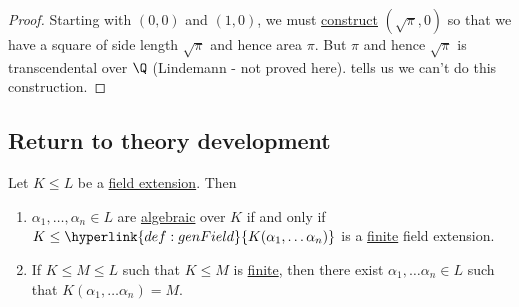 \documentclass{article}
\begin{document}
\begin{proof}
    Starting with $(0, 0)$ and $(1, 0)$, we must \hyperlink{def:constructible}{construct} $(\sqrt{\pi}, 0)$ so that we have a square of side length $\sqrt{\pi}$ and hence area $\pi$.
    But $\pi$ and hence $\sqrt{\pi}$ is transcendental over $\Q$ (Lindemann - not proved here).
     tells us we can't do this construction.
\end{proof}

\subsection{Return to theory development}
\begin{nlemma}\label{lem:1.19}
    Let $K \leq L$ be a \hyperlink{def:fieldExt}{field extension}. Then
    \begin{enumerate}[label=(\roman*)]
        \item $\alpha_1, \dotsc, \alpha_n \in L$ are \hyperlink{def:algebraic}{algebraic} over $K$ if and only if $K \leq \hyperlink{def:genField}{K(\alpha_1, \dotsc \alpha_n)}$ is a \hyperlink{def:degreeOfFieldExt}{finite} field extension.
        \item If $K \leq M \leq L$ such that $K \leq M$ is \hyperlink{def:degreeOfFieldExt}{finite}, then there exist $\alpha_1, \dotsc \alpha_n \in L$ such that $K(\alpha_1, \dotsc \alpha_n) = M$.
    \end{enumerate}
\end{nlemma}
\end{document}
